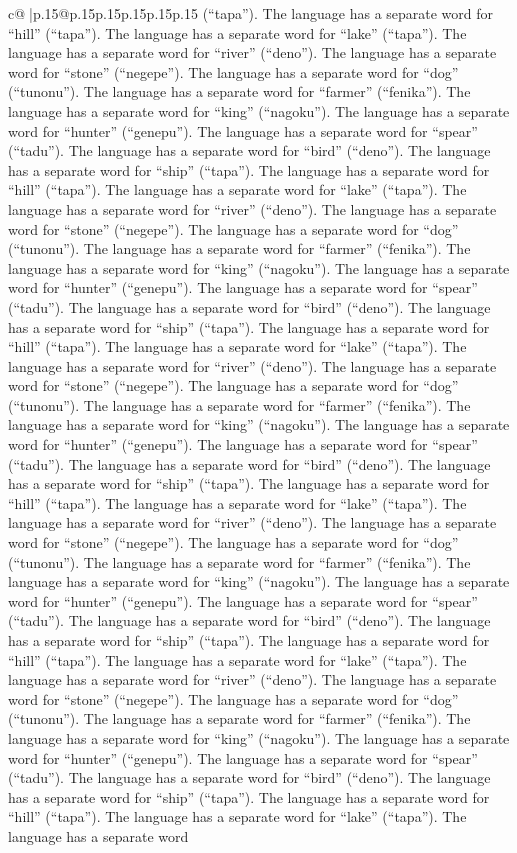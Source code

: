 \documentclass{article}
\begin{document}
{\begin{supertabular}{c@{$\;$}|p{.15\linewidth}@{}p{.15\linewidth}p{.15\linewidth}p{.15\linewidth}p{.15\linewidth}p{.15\linewidth}}
{{{(“tapa”). The language has a separate word for “hill” (“tapa”). The language has a separate word for “lake” (“tapa”). The language has a separate word for “river” (“deno”). The language has a separate word for “stone” (“negepe”). The language has a separate word for “dog” (“tunonu”). The language has a separate word for “farmer” (“fenika”). The language has a separate word for “king” (“nagoku”). The language has a separate word for “hunter” (“genepu”). The language has a separate word for “spear” (“tadu”). The language has a separate word for “bird” (“deno”). The language has a separate word for “ship” (“tapa”). The language has a separate word for “hill” (“tapa”). The language has a separate word for “lake” (“tapa”). The language has a separate word for “river” (“deno”). The language has a separate word for “stone” (“negepe”). The language has a separate word for “dog” (“tunonu”). The language has a separate word for “farmer” (“fenika”). The language has a separate word for “king” (“nagoku”). The language has a separate word for “hunter” (“genepu”). The language has a separate word for “spear” (“tadu”). The language has a separate word for “bird” (“deno”). The language has a separate word for “ship” (“tapa”). The language has a separate word for “hill” (“tapa”). The language has a separate word for “lake” (“tapa”). The language has a separate word for “river” (“deno”). The language has a separate word for “stone” (“negepe”). The language has a separate word for “dog” (“tunonu”). The language has a separate word for “farmer” (“fenika”). The language has a separate word for “king” (“nagoku”). The language has a separate word for “hunter” (“genepu”). The language has a separate word for “spear” (“tadu”). The language has a separate word for “bird” (“deno”). The language has a separate word for “ship” (“tapa”). The language has a separate word for “hill” (“tapa”). The language has a separate word for “lake” (“tapa”). The language has a separate word for “river” (“deno”). The language has a separate word for “stone” (“negepe”). The language has a separate word for “dog” (“tunonu”). The language has a separate word for “farmer” (“fenika”). The language has a separate word for “king” (“nagoku”). The language has a separate word for “hunter” (“genepu”). The language has a separate word for “spear” (“tadu”). The language has a separate word for “bird” (“deno”). The language has a separate word for “ship” (“tapa”). The language has a separate word for “hill” (“tapa”). The language has a separate word for “lake” (“tapa”). The language has a separate word for “river” (“deno”). The language has a separate word for “stone” (“negepe”). The language has a separate word for “dog” (“tunonu”). The language has a separate word for “farmer” (“fenika”). The language has a separate word for “king” (“nagoku”). The language has a separate word for “hunter” (“genepu”). The language has a separate word for “spear” (“tadu”). The language has a separate word for “bird” (“deno”). The language has a separate word for “ship” (“tapa”). The language has a separate word for “hill” (“tapa”). The language has a separate word for “lake” (“tapa”). The language has a separate word }}}
\end{supertabular}}
\end{document}
